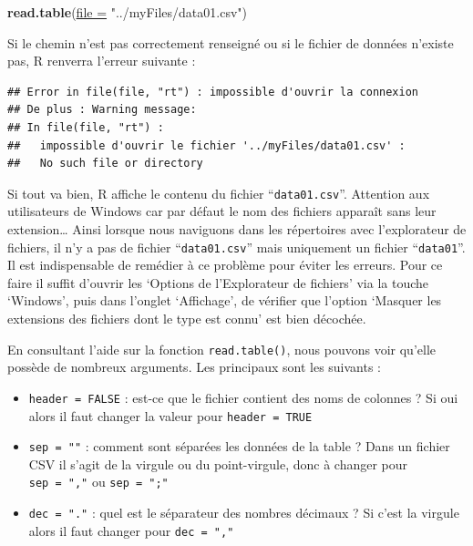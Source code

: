 \documentclass[twoside,symmetric]{book}
\newenvironment{Shaded}{}{}
\newcommand{\DataTypeTok}[1]{\underline{#1}}
\newcommand{\KeywordTok}[1]{\textbf{#1}}
\newcommand{\NormalTok}[1]{#1}
\newcommand{\StringTok}[1]{#1}
\providecommand{\tightlist}{%
  \setlength{\itemsep}{0pt}\setlength{\parskip}{0pt}}
\begin{document}
\begin{Shaded}
\begin{Highlighting}[]
\KeywordTok{read.table}\NormalTok{(}\DataTypeTok{file =} \StringTok{"../myFiles/data01.csv"}\NormalTok{)}
\end{Highlighting}
\end{Shaded}

Si le chemin n'est pas correctement renseigné ou si le fichier de données n'existe pas, R renverra l'erreur suivante :

\begin{verbatim}
## Error in file(file, "rt") : impossible d'ouvrir la connexion
## De plus : Warning message:
## In file(file, "rt") :
##   impossible d'ouvrir le fichier '../myFiles/data01.csv' : 
##   No such file or directory
\end{verbatim}

Si tout va bien, R affiche le contenu du fichier ``\texttt{data01.csv}''. Attention aux utilisateurs de Windows car par défaut le nom des fichiers apparaît sans leur extension\ldots{} Ainsi lorsque nous naviguons dans les répertoires avec l'explorateur de fichiers, il n'y a pas de fichier ``\texttt{data01.csv}'' mais uniquement un fichier ``\texttt{data01}''. Il est indispensable de remédier à ce problème pour éviter les erreurs. Pour ce faire il suffit d'ouvrir les `Options de l'Explorateur de fichiers' via la touche `Windows', puis dans l'onglet `Affichage', de vérifier que l'option `Masquer les extensions des fichiers dont le type est connu' est bien décochée.

En consultant l'aide sur la fonction \texttt{read.table()}, nous pouvons voir qu'elle possède de nombreux arguments. Les principaux sont les suivants :

\begin{itemize}
\tightlist
\item
  \texttt{header\ =\ FALSE} : est-ce que le fichier contient des noms de colonnes ? Si oui alors il faut changer la valeur pour \texttt{header\ =\ TRUE}
\item
  \texttt{sep\ =\ ""} : comment sont séparées les données de la table ? Dans un fichier CSV il s'agit de la virgule ou du point-virgule, donc à changer pour \texttt{sep\ =\ ","} ou \texttt{sep\ =\ ";"}
\item
  \texttt{dec\ =\ "."} : quel est le séparateur des nombres décimaux ? Si c'est la virgule alors il faut changer pour \texttt{dec\ =\ ","}
\end{itemize}
\end{document}
